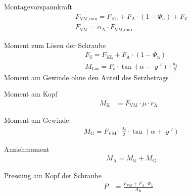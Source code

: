\begin{eeqn}{Montagevorspannkraft}
	\begin{align}
		& F_\text{VM,min} = F_\text{KL} + F_\text{A}\cdot (1-\Phi_\text{n})+F_\text{Z} \\
		& F_\text{VM} = \alpha_\text{A}\cdot F_\text{VM,min}
	\end{align}
\end{eeqn}

\begin{eeqn}{Moment zum Lösen der Schraube}
	\begin{align}
		& F_\text{S} = F_\text{KL} + F_\text{A}\cdot (1-\Phi_\text{n}) \\
		& M_\text{Lös} = F_\text{s} \cdot \tan (\alpha - \varrho') \cdot \frac{d_2}{2}
	\end{align}
	Moment am Gewinde ohne den Anteil des Setzbetrags
\end{eeqn}

\begin{eeqn}{Moment am Kopf}
	\begin{align}
		M_\text{K} & = F_\text{VM} \cdot \mu \cdot r_\text{A}
	\end{align}
\end{eeqn}

\begin{eeqn}{Moment am Gewinde}
	\begin{align}
		& M_\text{G} = F_\text{VM} \cdot \frac{d_2}{2} \cdot \tan{(\alpha+\varrho')}
	\end{align}
\end{eeqn}

\begin{eeqn}{Anziehmoment}
	\begin{align}
		& M_\text{A} = M_\text{K} + M_\text{G}
	\end{align}
\end{eeqn}


\begin{eeqn}{Pressung am Kopf der Schraube}
	\begin{align}
		P &= \frac{F_\text{VM}+F_\text{A}\cdot\Phi_\text{n}}{A_\text{K}}
	\end{align}
\end{eeqn}

